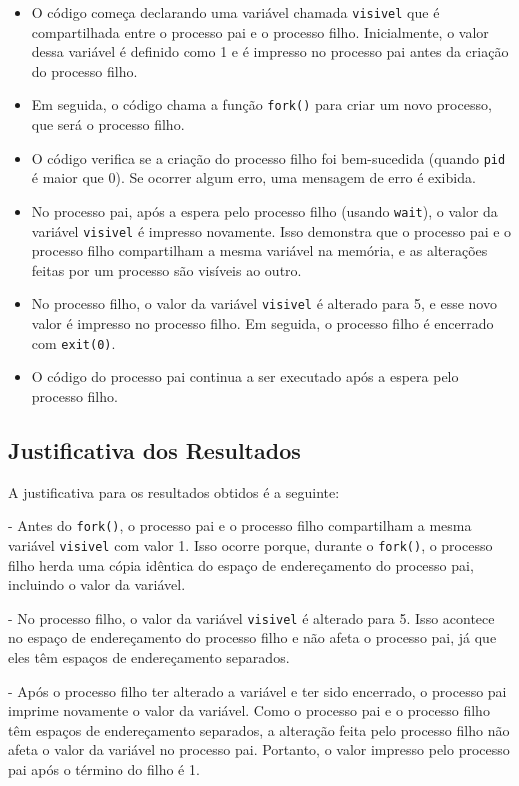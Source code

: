 \documentclass[
	12pt,				%
	openright,			%
	oneside,			%
	a4paper,			%
	chapter=TITLE,		%
	english,			%
	french,				%
	spanish,			%
	brazil				%
	]{abntex2}
\theoremstyle{definition}
\begin{document}
\begin{itemize}
    \item O código começa declarando uma variável chamada \texttt{visivel} que é compartilhada entre o processo pai e o processo filho. Inicialmente, o valor dessa variável é definido como 1 e é impresso no processo pai antes da criação do processo filho.
    \item Em seguida, o código chama a função \texttt{fork()} para criar um novo processo, que será o processo filho.
    \item O código verifica se a criação do processo filho foi bem-sucedida (quando \texttt{pid} é maior que 0). Se ocorrer algum erro, uma mensagem de erro é exibida.
    \item No processo pai, após a espera pelo processo filho (usando \texttt{wait}), o valor da variável \texttt{visivel} é impresso novamente. Isso demonstra que o processo pai e o processo filho compartilham a mesma variável na memória, e as alterações feitas por um processo são visíveis ao outro.
    \item No processo filho, o valor da variável \texttt{visivel} é alterado para 5, e esse novo valor é impresso no processo filho. Em seguida, o processo filho é encerrado com \texttt{exit(0)}.
    \item O código do processo pai continua a ser executado após a espera pelo processo filho.
\end{itemize}

\subsection{Justificativa dos Resultados}

A justificativa para os resultados obtidos é a seguinte:

- Antes do \texttt{fork()}, o processo pai e o processo filho compartilham a mesma variável \texttt{visivel} com valor 1. Isso ocorre porque, durante o \texttt{fork()}, o processo filho herda uma cópia idêntica do espaço de endereçamento do processo pai, incluindo o valor da variável.

- No processo filho, o valor da variável \texttt{visivel} é alterado para 5. Isso acontece no espaço de endereçamento do processo filho e não afeta o processo pai, já que eles têm espaços de endereçamento separados.

- Após o processo filho ter alterado a variável e ter sido encerrado, o processo pai imprime novamente o valor da variável. Como o processo pai e o processo filho têm espaços de endereçamento separados, a alteração feita pelo processo filho não afeta o valor da variável no processo pai. Portanto, o valor impresso pelo processo pai após o término do filho é 1.
\end{document}
